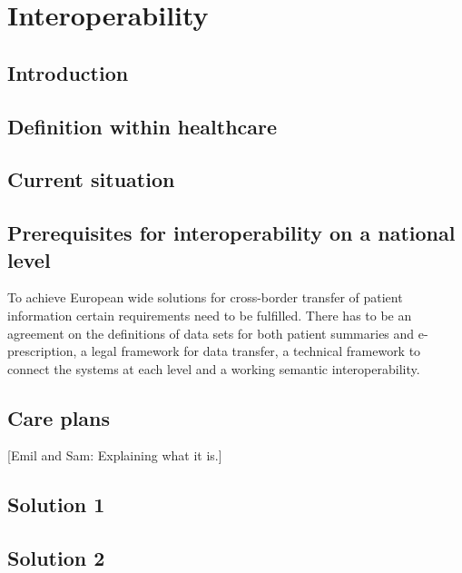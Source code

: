 \documentclass[14pt]{article}
\begin{document}
\newpage

\section{Interoperability}

\subsection{Introduction} %

\subsection{Definition within healthcare} %
\label{sec:interopDefinition}

\subsection{Current situation} %
\subsection{Prerequisites for interoperability on a national level}

To achieve European wide solutions for cross-border transfer of patient information certain requirements need to be fulfilled. There has to be an agreement on the definitions of data sets for both patient summaries and e-prescription, a legal framework for data transfer, a technical framework to connect the systems at each level and a working semantic \gls{interoperability}. \cite{epSOS1}

\subsection{Care plans}
[Emil and Sam: Explaining what it is.]

\subsection{Solution 1}
\subsection{Solution 2}
\end{document}
